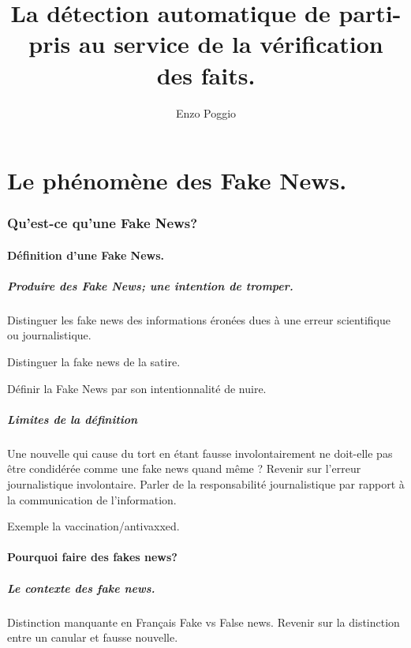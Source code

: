 \documentclass[onecolumn, 12pt]{article}
\title{La détection automatique de parti-pris au service de la vérification
  des faits.}
\author{Enzo Poggio}
\begin{document}
\maketitle{}



\part{Le phénomène des Fake News.}

\section{Qu'est-ce qu'une Fake News?}
  \subsection{Définition d'une Fake News.}
    \subsubsection{Produire des Fake News; une intention de tromper.}
    Distinguer les fake news des informations éronées dues à une erreur
    scientifique ou journalistique.

    Distinguer la fake news de la satire.

    Définir la Fake News par son intentionnalité de nuire.
    \subsubsection{Limites de la définition}
    Une nouvelle qui cause du tort en étant fausse involontairement ne
    doit-elle pas être condidérée comme une fake news quand même ? Revenir
    sur l'erreur journalistique involontaire. Parler de la responsabilité
    journalistique par rapport à la communication de l'information.

    Exemple la vaccination/antivaxxed.

  \subsection{Pourquoi faire des fakes news?}
    \subsubsection{Le contexte des fake news.}
    Distinction manquante en Français Fake vs False news. Revenir sur la
    distinction entre un canular et fausse nouvelle.
\end{document}
